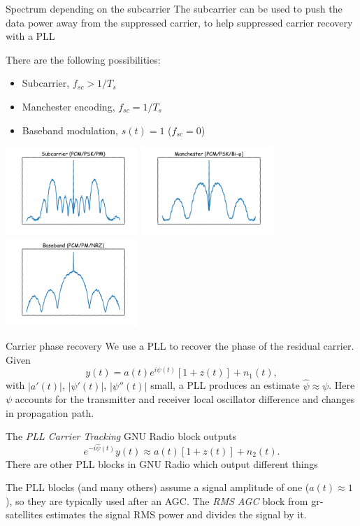 \documentclass[aspectratio=169]{beamer}
\begin{document}
\begin{frame}{Spectrum depending on the subcarrier}
  The subcarrier can be used to push the data power away from the suppressed
  carrier, to help suppressed carrier recovery with a PLL

  There are the following possibilities:
  \begin{itemize}
  \item Subcarrier, $f_{sc} > 1/T_s$
  \item Manchester encoding, $f_{sc} = 1/T_s$
  \item Baseband modulation, $s(t) = 1$ ($f_{sc} = 0$)
  \end{itemize}
  
\begin{center}
  \includegraphics[width=5cm]{subcarrier}
  \includegraphics[width=5cm]{manchester}
  \includegraphics[width=5cm]{baseband}
\end{center}
\end{frame}

\begin{frame}{Carrier phase recovery}
  We use a PLL to recover the phase of the residual carrier. Given
  \[
  y(t) = a(t) e^{i\psi(t)} [1 + z(t)] + n_1(t),
  \]
  with $|a'(t)|$, $|\psi'(t)|$, $|\psi''(t)|$ small, a PLL produces an estimate
  $\widehat{\psi} \approx \psi$. Here $\psi$ accounts for the transmitter and
  receiver local oscillator difference and changes in propagation path.

  \medskip

  The \emph{PLL Carrier Tracking} GNU Radio block outputs
  \[
  e^{-i\widehat{\psi}(t)} y(t) \approx a(t)[1 + z(t)] + n_2(t).
  \]
  There are other PLL blocks in GNU Radio which output different things

  \medskip
  
  The PLL blocks (and many others) assume a signal amplitude of one
  ($a(t) \approx 1$), so they are typically used after an AGC. The \emph{RMS AGC}
  block from gr-satellites estimates the signal RMS power and divides the signal
  by it.
\end{frame}
\end{document}
